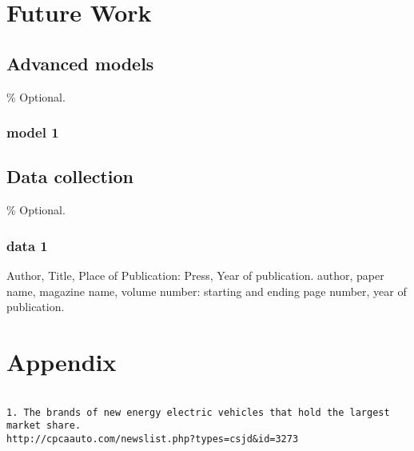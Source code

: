 \documentclass{apmcmthesis}
\begin{document}
\section{Future Work}

\subsection{Advanced models}
\% Optional.

\subsubsection{model 1}

\subsection{Data collection}
\% Optional.

\subsubsection{data 1}




\begin{thebibliography}{9}%
 Author, Title, Place of Publication: Press, Year of publication.
 author, paper name, magazine name, volume number: starting and ending
page number, year of publication.

\end{thebibliography}

\newpage

\section{Appendix}

\begin{lstlisting}[caption={Data source}]

1. The brands of new energy electric vehicles that hold the largest market share.
http://cpcaauto.com/newslist.php?types=csjd&id=3273

\end{lstlisting}
\end{document}
